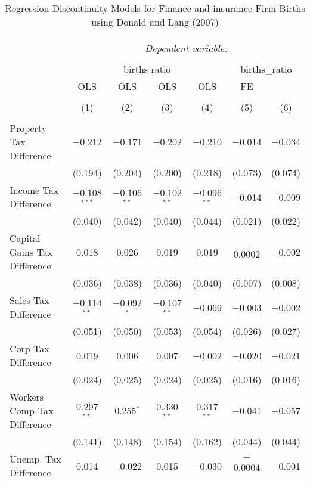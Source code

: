 
\begin{table}[!htbp] \centering 
  \caption{Regression Discontinuity Models for  Finance and insurance Firm Births using Donald and Lang (2007)} 
  \label{} 
\begin{tabular}{@{\extracolsep{5pt}}lcccccc} 
\\[-1.8ex]\hline 
\hline \\[-1.8ex] 
 & \multicolumn{6}{c}{\textit{Dependent variable:}} \\ 
\cline{2-7} 
\\[-1.8ex] & \multicolumn{4}{c}{births ratio} & \multicolumn{2}{c}{births\_ratio} \\ 
 & OLS & OLS & OLS & OLS & FE &  \\ 
\\[-1.8ex] & (1) & (2) & (3) & (4) & (5) & (6)\\ 
\hline \\[-1.8ex] 
 Property Tax Difference & $-$0.212 & $-$0.171 & $-$0.202 & $-$0.210 & $-$0.014 & $-$0.034 \\ 
  & (0.194) & (0.204) & (0.200) & (0.218) & (0.073) & (0.074) \\ 
  Income Tax Difference & $-$0.108$^{***}$ & $-$0.106$^{**}$ & $-$0.102$^{**}$ & $-$0.096$^{**}$ & $-$0.014 & $-$0.009 \\ 
  & (0.040) & (0.042) & (0.040) & (0.044) & (0.021) & (0.022) \\ 
  Capital Gains Tax Difference & 0.018 & 0.026 & 0.019 & 0.019 & $-$0.0002 & $-$0.002 \\ 
  & (0.036) & (0.038) & (0.036) & (0.040) & (0.007) & (0.008) \\ 
  Sales Tax Difference & $-$0.114$^{**}$ & $-$0.092$^{*}$ & $-$0.107$^{**}$ & $-$0.069 & $-$0.003 & $-$0.002 \\ 
  & (0.051) & (0.050) & (0.053) & (0.054) & (0.026) & (0.027) \\ 
  Corp Tax Difference & 0.019 & 0.006 & 0.007 & $-$0.002 & $-$0.020 & $-$0.021 \\ 
  & (0.024) & (0.025) & (0.024) & (0.025) & (0.016) & (0.016) \\ 
  Workers Comp Tax Difference & 0.297$^{**}$ & 0.255$^{*}$ & 0.330$^{**}$ & 0.317$^{**}$ & $-$0.041 & $-$0.057 \\ 
  & (0.141) & (0.148) & (0.154) & (0.162) & (0.044) & (0.044) \\ 
  Unemp. Tax Difference & 0.014 & $-$0.022 & 0.015 & $-$0.030 & $-$0.0004 & $-$0.001 \\ 

\end{tabular}
\end{table}
